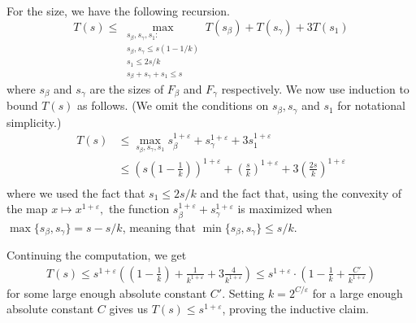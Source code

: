 \documentclass[10pt,a4paper]{article}
\begin{document}
For the size, we have the following recursion.
\[
T(s) \leq \max_{\substack{s_\beta,s_\gamma, s_1:\\ s_\beta, s_\gamma \leq s(1-1/k)\\ s_1 \leq 2s/k\\ s_\beta+s_\gamma+ s_1 \leq s}}T(s_\beta) + T(s_\gamma) + 3T(s_1)
\] 
where $s_\beta$ and $s_\gamma$ are the sizes of $F_\beta$ and $F_\gamma$ respectively. We now use induction to bound $T(s)$ as follows. (We omit the conditions on $s_\beta, s_\gamma$ and $s_1$ for notational simplicity.)
\begin{align*}
	T(s) &\leq \max_{s_\beta,s_\gamma, s_1} s_\beta^{1+\varepsilon} + s_\gamma^{1+\varepsilon} + 3 s_1^{1+\varepsilon}\\
	&\leq \left(s\left(1-\frac{1}{k}\right)\right)^{1+\varepsilon} + \left(\frac{s}{k}\right)^{1+\varepsilon} + 3 \left(\frac{2s}{k}\right)^{1+\varepsilon}\\
\end{align*}
where we used the fact that $s_1 \leq 2s/k$ and the fact that, using the convexity of the map $x\mapsto x^{1+\varepsilon},$ the function $s_\beta^{1+\varepsilon} + s_\gamma^{1+\varepsilon}$ is maximized when $\max\{s_\beta,s_\gamma\} = s-s/k$, meaning that $\min\{s_\beta,s_\gamma\}\leq s/k.$ 

Continuing the computation, we get
\begin{align*}
	T(s) \leq s^{1+\varepsilon} \left(\left(1-\frac{1}{k}\right) + \frac{1}{k^{1+\varepsilon}} + 3\frac{4}{k^{1+\varepsilon}}\right)\leq s^{1+\varepsilon}\cdot \left( 1-\frac{1}{k} + \frac{C'}{ k^{1+\varepsilon}}\right)
\end{align*}
for some large enough absolute constant $C'$. Setting $k = 2^{C/\varepsilon}$ for a large enough absolute constant $C$ gives us $T(s) \leq s^{1+\varepsilon}$, proving the inductive claim.
\end{document}
